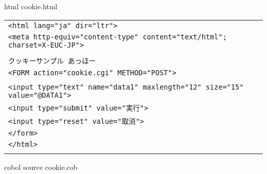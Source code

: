 {\gt html} cookie.html

{\footnotesize 
\begin{tabular}{|l|}
\hline
\vspace{-0.4em}\verb!<html lang="ja" dir="ltr">!\\
\vspace{-0.4em}\verb!<meta http-equiv="content-type" content="text/html"; charset=X-EUC-JP">!\\
\vspace{-0.4em}\verb!!\\
\vspace{-0.4em}\verb!クッキーサンプル あっほー!\\
\vspace{-0.4em}\verb!<FORM action="cookie.cgi" METHOD="POST">!\\
\vspace{-0.4em}\verb!!\\
\vspace{-0.4em}\verb!<input type="text" name="data1" maxlength="12" size="15" value="@DATA1">!\\
\vspace{-0.4em}\verb!<input type="submit" value="実行">!\\
\vspace{-0.4em}\verb!<input type="reset" value="取消">!\\
\vspace{-0.4em}\verb!</form>!\\
\vspace{-0.4em}\verb!</html>!\\
\\
\hline
\end{tabular}
}

\vspace{1em}
{\gt cobol source} cookie.cob

